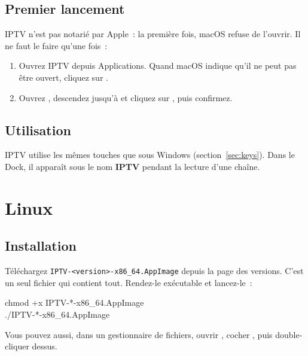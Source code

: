 \subsection{Premier lancement}
IPTV n'est pas notarié par Apple~: la première fois, macOS refuse de
l'ouvrir. Il ne faut le faire qu'une fois~:
\begin{enumerate}
  \item Ouvrez IPTV depuis Applications. Quand macOS indique qu'il ne peut
        pas être ouvert, cliquez sur .
  \item Ouvrez , descendez jusqu'à  et
        cliquez sur , puis confirmez.
\end{enumerate}

\subsection{Utilisation}
IPTV utilise les mêmes touches que sous Windows (section~\ref{sec:keys}).
Dans le Dock, il apparaît sous le nom \textbf{IPTV} pendant la lecture d'une
chaîne.


\section{Linux}

\subsection{Installation}
Téléchargez \texttt{IPTV-\textless version\textgreater-x86\_64.AppImage}
depuis la page des versions. C'est un seul fichier qui contient tout.
Rendez-le exécutable et lancez-le~:
\begin{center}
\begin{minipage}{0.8\linewidth}
\small\ttfamily chmod +x IPTV-*-x86\_64.AppImage\\
./IPTV-*-x86\_64.AppImage
\end{minipage}
\end{center}
Vous pouvez aussi, dans un gestionnaire de fichiers, ouvrir
, cocher , puis double-cliquer dessus.

